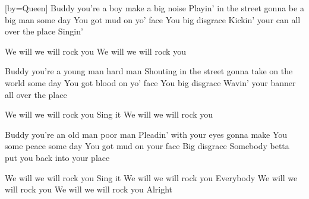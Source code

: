 [by={Queen}]
\beginverse
Buddy you're a boy make a big noise
Playin' in the street gonna be a big man some day
You got mud on yo' face
You big disgrace
Kickin' your can all over the place
Singin'
\endverse

\beginchorus
We will we will rock you
We will we will rock you
\endchorus

\beginverse 
Buddy you're a young man hard man
Shouting in the street gonna take on the world some day
You got blood on yo' face
You big disgrace
Wavin' your banner all over the place
\endverse

\beginchorus
We will we will rock you
Sing it
We will we will rock you
\endchorus
 
\beginverse
Buddy you're an old man poor man
Pleadin' with your eyes gonna make
You some peace some day
You got mud on your face
Big disgrace
Somebody betta put you back into your place
\endverse

\beginchorus
We will we will rock you
Sing it
We will we will rock you
Everybody
We will we will rock you
We will we will rock you
Alright
\endchorus
\endsong
